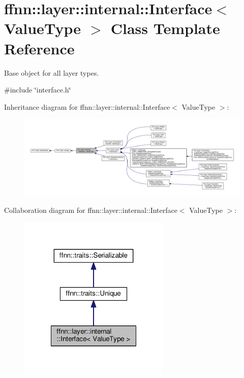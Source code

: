 \hypertarget{classffnn_1_1layer_1_1internal_1_1_interface}{\section{ffnn\-:\-:layer\-:\-:internal\-:\-:Interface$<$ Value\-Type $>$ Class Template Reference}
\label{classffnn_1_1layer_1_1internal_1_1_interface}
}


Base object for all layer types.  




{\ttfamily \#include \char`\"{}interface.\-h\char`\"{}}



Inheritance diagram for ffnn\-:\-:layer\-:\-:internal\-:\-:Interface$<$ Value\-Type $>$\-:
\nopagebreak
\begin{figure}[H]
\begin{center}
\leavevmode
\includegraphics[width=350pt]{classffnn_1_1layer_1_1internal_1_1_interface__inherit__graph}
\end{center}
\end{figure}


Collaboration diagram for ffnn\-:\-:layer\-:\-:internal\-:\-:Interface$<$ Value\-Type $>$\-:\nopagebreak
\begin{figure}[H]
\begin{center}
\leavevmode
\includegraphics[width=204pt]{classffnn_1_1layer_1_1internal_1_1_interface__coll__graph}
\end{center}
\end{figure}
